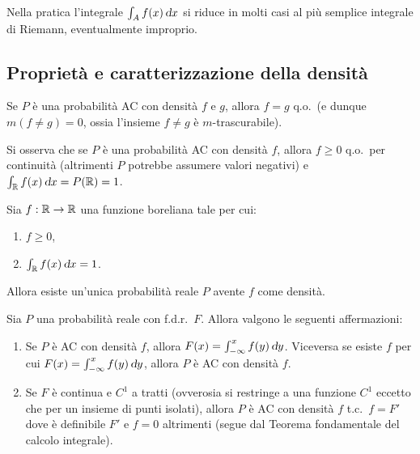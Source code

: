\begin{multicols*}{2}
\begin{remark}
    Nella pratica l'integrale $\int_A f(x) \dx$ si riduce in molti casi
    al più semplice integrale di Riemann, eventualmente improprio.
\end{remark}

\subsection{Proprietà e caratterizzazione della densità}

\begin{proposition}
    Se $P$ è una probabilità AC con densità $f$ e $g$, allora
    $f = g$ q.o.~(e dunque $m(f \neq g) = 0$, ossia l'insieme
    $f \neq g$ è $m$-trascurabile).
\end{proposition}

\begin{remark}
    Si osserva che se $P$ è una probabilità AC con densità
    $f$, allora $f \geq 0$ q.o.~per continuità (altrimenti $P$ potrebbe
    assumere valori negativi) e $\int_\RR f(x) \dx = P(\RR) = 1$.
\end{remark}

\begin{proposition}
    Sia $f : \mathbb{R} \to \mathbb{R}$ una funzione boreliana tale per cui:
    \begin{enumerate}[(i.)]
        \item $f \geq 0$,
        \item $\int_\RR f(x) \dx = 1$.
    \end{enumerate}
    Allora esiste un'unica probabilità reale $P$ avente $f$ come densità.
\end{proposition}

\begin{proposition}
    Sia $P$ una probabilità reale con f.d.r.~$F$. Allora valgono le seguenti affermazioni:
    \begin{enumerate}[(i.)]
        \item Se $P$ è AC con densità $f$, allora $F(x) = \int_{-\infty}^x f(y) \dy$. Viceversa
        se esiste $f$ per cui $F(x) = \int_{-\infty}^x f(y) \dy$, allora $P$ è AC con densità
        $f$.
        \item Se $F$ è continua e $C^1$ a tratti (ovverosia si restringe a una funzione $C^1$ eccetto che per un insieme di punti isolati),
        allora $P$ è AC con densità $f$ t.c.~$f = F'$ dove è definibile $F'$ e $f = 0$ altrimenti (segue dal Teorema fondamentale del calcolo integrale).
    \end{enumerate}
\end{proposition}


\end{multicols*}
